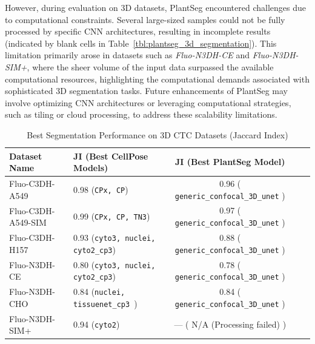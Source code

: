 \documentclass[./dissertation.tex]{subfiles}
\begin{document}
However, during evaluation on 3D datasets, PlantSeg encountered challenges due to computational constraints. Several large-sized samples could not be fully processed by specific CNN architectures, resulting in incomplete results (indicated by blank cells in Table~\ref{tbl:plantseg_3d_segmentation}). This limitation primarily arose in datasets such as \textit{Fluo-N3DH-CE} and \textit{Fluo-N3DH-SIM+}, where the sheer volume of the input data surpassed the available computational resources, highlighting the computational demands associated with sophisticated 3D segmentation tasks. Future enhancements of PlantSeg may involve optimizing CNN architectures or leveraging computational strategies, such as tiling or cloud processing, to address these scalability limitations.


\begin{table}[!ht]
    \centering
    \caption{Best Segmentation Performance on 3D CTC Datasets (Jaccard Index)}
    \label{tbl:best_3d_segmentation_summary}
    \renewcommand{\arraystretch}{1.2} %
    \small %
    \begin{tabular}{|l|l|c|l|c|}
        \hline
        \textbf{Dataset Name} & \textbf{JI (Best CellPose Models)}        & \textbf{JI (Best PlantSeg Model)}                  \\ \hline
        Fluo-C3DH-A549        & 0.98 (\texttt{CPx, CP})                   & 0.96 ( \texttt{generic\_confocal\_3D\_unet}\*    ) \\ \hline
        Fluo-C3DH-A549-SIM    & 0.99 (\texttt{CPx, CP, TN3})              & 0.97 ( \texttt{generic\_confocal\_3D\_unet}\*    ) \\ \hline
        Fluo-C3DH-H157        & 0.93 (\texttt{cyto3, nuclei, cyto2\_cp3}) & 0.88 ( \texttt{generic\_confocal\_3D\_unet}\*    ) \\ \hline
        Fluo-N3DH-CE          & 0.80 (\texttt{cyto3, nuclei, cyto2\_cp3}) & 0.78 ( \texttt{generic\_confocal\_3D\_unet}\*\*  ) \\ \hline
        Fluo-N3DH-CHO         & 0.84 (\texttt{nuclei, tissuenet\_cp3 })   & 0.84 ( \texttt{generic\_confocal\_3D\_unet}\*    ) \\ \hline
        Fluo-N3DH-SIM+        & 0.94 (\texttt{cyto2})                     & ---  (   N/A (Processing failed)\*\*\*           ) \\ \hline
    \end{tabular}
\end{table}
\end{document}
